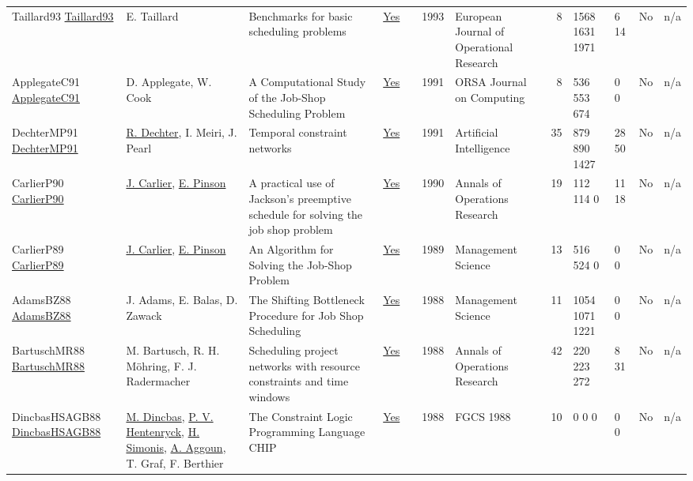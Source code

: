 {\begin{longtable}{>{\raggedright\arraybackslash}p{3cm}>{\raggedright\arraybackslash}p{4.5cm}>{\raggedright\arraybackslash}p{6.0cm}rrrp{2.5cm}rp{1cm}p{1cm}rr}
Taillard93 \href{http://dx.doi.org/10.1016/0377-2217(93)90182-m}{Taillard93} & E. Taillard & Benchmarks for basic scheduling problems & \href{../works/Taillard93.pdf}{Yes} & \cite{Taillard93} & 1993 & European Journal of Operational Research & 8 & 1568 1631 1971 & 6 14 & No & n/a\\
ApplegateC91 \href{http://dx.doi.org/10.1287/ijoc.3.2.149}{ApplegateC91} & D. Applegate, W. Cook & A Computational Study of the Job-Shop Scheduling Problem & \href{../works/ApplegateC91.pdf}{Yes} & \cite{ApplegateC91} & 1991 & ORSA Journal on Computing & 8 & 536 553 674 & 0 0 & No & n/a\\
DechterMP91 \href{http://dx.doi.org/10.1016/0004-3702(91)90006-6}{DechterMP91} & \hyperref[auth:a300]{R. Dechter}, I. Meiri, J. Pearl & Temporal constraint networks & \href{../works/DechterMP91.pdf}{Yes} & \cite{DechterMP91} & 1991 & Artificial Intelligence & 35 & 879 890 1427 & 28 50 & No & n/a\\
CarlierP90 \href{http://dx.doi.org/10.1007/bf03543071}{CarlierP90} & \hyperref[auth:a845]{J. Carlier}, \hyperref[auth:a846]{E. Pinson} & A practical use of Jackson's preemptive schedule for solving the job shop problem & \href{../works/CarlierP90.pdf}{Yes} & \cite{CarlierP90} & 1990 & Annals of Operations Research & 19 & 112 114 0 & 11 18 & No & n/a\\
CarlierP89 \href{http://dx.doi.org/10.1287/mnsc.35.2.164}{CarlierP89} & \hyperref[auth:a845]{J. Carlier}, \hyperref[auth:a846]{E. Pinson} & An Algorithm for Solving the Job-Shop Problem & \href{../works/CarlierP89.pdf}{Yes} & \cite{CarlierP89} & 1989 & Management Science & 13 & 516 524 0 & 0 0 & No & n/a\\
AdamsBZ88 \href{http://dx.doi.org/10.1287/mnsc.34.3.391}{AdamsBZ88} & J. Adams, E. Balas, D. Zawack & The Shifting Bottleneck Procedure for Job Shop Scheduling & \href{../works/AdamsBZ88.pdf}{Yes} & \cite{AdamsBZ88} & 1988 & Management Science & 11 & 1054 1071 1221 & 0 0 & No & n/a\\
BartuschMR88 \href{http://dx.doi.org/10.1007/bf02283745}{BartuschMR88} & M. Bartusch, R. H. M\"{o}hring, F. J. Radermacher & Scheduling project networks with resource constraints and time windows & \href{../works/BartuschMR88.pdf}{Yes} & \cite{BartuschMR88} & 1988 & Annals of Operations Research & 42 & 220 223 272 & 8 31 & No & n/a\\
DincbasHSAGB88 \href{}{DincbasHSAGB88} & \hyperref[auth:a717]{M. Dincbas}, \hyperref[auth:a148]{P. V. Hentenryck}, \hyperref[auth:a17]{H. Simonis}, \hyperref[auth:a725]{A. Aggoun}, T. Graf, F. Berthier & The Constraint Logic Programming Language {CHIP} & \href{../works/DincbasHSAGB88.pdf}{Yes} & \cite{DincbasHSAGB88} & 1988 & FGCS 1988 & 10 & 0 0 0 & 0 0 & No & n/a\\

\end{longtable}}
